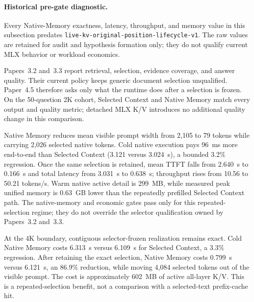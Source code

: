 \documentclass[11pt]{article}
\newcommand{\EngineContract}{\texttt{live-kv-original-\allowbreak position-\allowbreak lifecycle-v1}}
\begin{document}
\paragraph{Historical pre-gate diagnostic.}
Every Native-Memory exactness, latency, throughput, and memory value in this
subsection predates \EngineContract{}. The raw
values are retained for audit and hypothesis formation only; they do not
qualify current MLX behavior or workload economics.

Papers~3.2 and~3.3 report retrieval, selection, evidence coverage, and answer
quality.  Their current policy keeps generic document selection unqualified.
Paper~4.5 therefore asks only what the runtime does after a selection is frozen.
On the 50-question 2K cohort, Selected Context and Native Memory match every
output and quality metric; detached MLX K/V introduces no additional quality
change in this comparison.

\begin{table}[H]
\centering
\scriptsize
\caption{MLX-LM Qwen3-4B 4-bit realization metrics for 50 frozen 2K RAG
selections on a 48~GiB M4 Pro. Times are milliseconds; cold includes native
encoding, while warm Native Memory reuses retained immutable K/V.}
\resizebox{\linewidth}{!}{%
}
\label{tab:powered-rag-runtime}
\end{table}

Native Memory reduces mean visible prompt width from 2,105 to 79 tokens while
carrying 2,026 selected native tokens. Cold native execution pays 96~ms more
end-to-end than Selected Context (3.121 versus 3.024~s), a bounded 3.2\%
regression. Once the same selection is retained, mean TTFT falls from 2.640~s
to 0.166~s and total latency from 3.031~s to 0.638~s; throughput rises from
10.56 to 50.21 tokens/s. Warm native active detail is 299~MB, while measured
peak unified memory is 0.63~GB lower than the repeatedly prefilled Selected
Context path. The native-memory and economic gates pass only for this repeated-
selection regime; they do not override the selector qualification owned by
Papers~3.2 and~3.3.

At the 4K boundary, contiguous selector-frozen realization remains exact. Cold Native
Memory costs 6.313~s versus 6.109~s for Selected Context, a 3.3\% regression.
After retaining the exact selection, Native Memory costs 0.799~s versus
6.121~s, an 86.9\% reduction, while moving 4,084 selected tokens out of the
visible prompt. The cost is approximately 602~MB of active all-layer K/V.
This is a repeated-selection benefit, not a comparison with a selected-text
prefix-cache hit.
\end{document}
